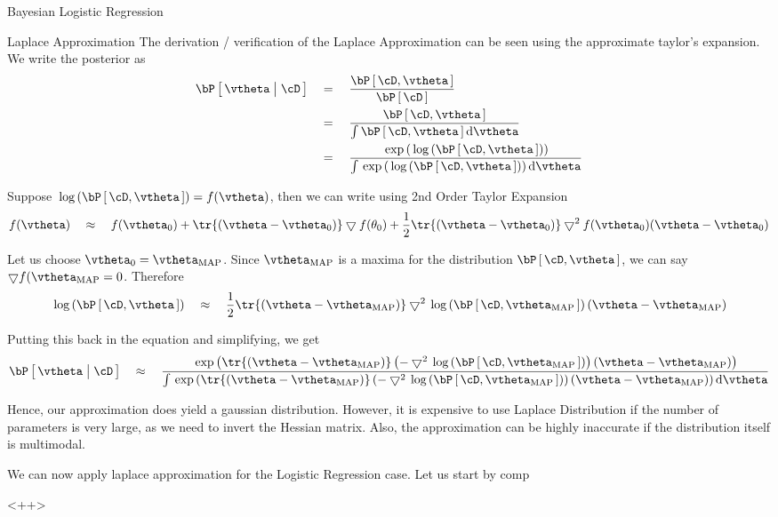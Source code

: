 \documentclass{article}
\begin{document}
\begin{ssection}{Bayesian Logistic Regression}
\begin{ssubsection}{Laplace Approximation}
		The derivation / verification of the Laplace Approximation can be seen using the approximate taylor's expansion. We write the posterior as
		\begin{align*}
			\prob{\vtheta \pipe \cD}	&\eq	\frac{\prob{\cD, \vtheta}}{\prob{\cD}} \\
										&\eq	\frac{\prob{\cD, \vtheta}}{\int \prob{\cD, \vtheta} \text{d}\vtheta} \\
										&\eq	\frac{\texp{\log{\prob{\cD, \vtheta}}}}{\int \texp{\log{\prob{\cD, \vtheta}}} \text{d}\vtheta}
		\end{align*}

		Suppose $\log{\prob{\cD, \vtheta}} = f(\vtheta)$, then we can write using 2nd Order Taylor Expansion
		\begin{align*}
			f(\vtheta)	\qapprox	f(\vtheta_0) + \tr{(\vtheta - \vtheta_0)} \bigtriangledown f(\theta_0) + \frac{1}{2} \tr{(\vtheta - \vtheta_0)} \bigtriangledown^2 f(\vtheta_0) (\vtheta - \vtheta_0)
		\end{align*}

		Let us choose $\vtheta_0 = \vtheta_{\text{MAP}}$. Since $\vtheta_{\text{MAP}}$ is a maxima for the distribution $\prob{\cD, \vtheta}$, we can say $\bigtriangledown f(\vtheta_{\text{MAP}} = 0$. Therefore
		\begin{align*}
			\log{\prob{\cD, \vtheta}}	\qapprox	\frac{1}{2} \tr{(\vtheta - \vtheta_{\text{MAP}})} \bigtriangledown^2 \log{\prob{\cD, \vtheta_{\text{MAP}}}} (\vtheta - \vtheta_{\text{MAP}})
		\end{align*}

		Putting this back in the equation and simplifying, we get
		\begin{align*}
			\prob{\vtheta \pipe \cD}	\qapprox	\frac{\texp{\tr{(\vtheta - \vtheta_{\text{MAP}})} \para{- \bigtriangledown^2 \log{\prob{\cD, \vtheta_{\text{MAP}}}}} (\vtheta - \vtheta_{\text{MAP}})}}{\int \texp{\tr{(\vtheta - \vtheta_{\text{MAP}})} \para{- \bigtriangledown^2 \log{\prob{\cD, \vtheta_{\text{MAP}}}}} (\vtheta - \vtheta_{\text{MAP}})} \text{d}\vtheta}
		\end{align*}

		Hence, our approximation does yield a gaussian distribution. However, it is expensive to use Laplace Distribution if the number of parameters is very large, as we need to invert the Hessian matrix. Also, the approximation can be highly inaccurate if the distribution itself is multimodal.

	\end{ssubsection}

	We can now apply laplace approximation for the Logistic Regression case. Let us start by comp

\end{ssection}<++>
\end{document}
